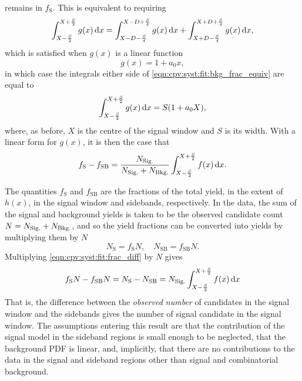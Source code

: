 remains in $f_{\text{S}}$.
This is equivalent to requiring
\begin{equation}
    \int_{X - \frac{S}{2}}^{X + \frac{S}{2}} g(x) \mathop{}\!\textnormal{d}{x}
    =
    \int_{X - D - \frac{S}{4}}^{X - D + \frac{S}{4}} g(x) \mathop{}\!\textnormal{d}{x} +
    \int_{X + D - \frac{S}{4}}^{X + D + \frac{S}{4}} g(x) \mathop{}\!\textnormal{d}{x},
  \label{eqn:cpv:syst:fit:bkg_frac_equiv}
\end{equation}
which is satisfied when $g(x)$ is a linear function
\begin{equation*}
  g(x) = 1 + a_{0}x,
\end{equation*}
in which case the integrals either side of 
\cref{eqn:cpv:syst:fit:bkg_frac_equiv} are equal to
\begin{equation}
    \int_{X - \frac{S}{2}}^{X + \frac{S}{2}} g(x) \mathop{}\!\textnormal{d}{x} =
      S(1 + a_{0}X),
\end{equation}
where, as before, $X$ is the centre of the signal window and $S$ is its width.
With a linear form for $g(x)$, it is then the case that
\begin{equation}
  f_{\text{S}} - f_{\text{SB}} = \frac{N_{\text{Sig.}}}{N_{\text{Sig.}} + N_{\text{Bkg.}}}
    \int_{X - \frac{S}{2}}^{X + \frac{S}{2}} f(x) \mathop{}\!\textnormal{d}{x}.
  \label{eqn:cpv:syst:fit:frac_diff}
\end{equation}

The quantities $f_{\text{S}}$ and $f_{\text{SB}}$ are the fractions of the 
total yield, in the extent of $h(x)$, in the signal window and sidebands, 
respectively.
In the data, the sum of the signal and background yields is taken to be the 
observed candidate count $N = N_{\text{Sig.}} + N_{\text{Bkg.}}$, and so the yield fractions can be 
converted into yields by multiplying them by $N$
\begin{equation}
  N_{\text{S}} = f_{\text{S}}N,\quad
  N_{\text{SB}} = f_{\text{SB}}N.
\end{equation}
Multiplying \cref{eqn:cpv:syst:fit:frac_diff} by $N$ gives
\begin{equation}
  f_{\text{S}}N - f_{\text{SB}}N =
    N_{\text{S}} - N_{\text{SB}} =
    N_{\text{Sig.}}
    \int_{X - \frac{S}{2}}^{X + \frac{S}{2}} f(x) \mathop{}\!\textnormal{d}{x}
  \label{eqn:cpv:syst:fit:frac_diff}
\end{equation}
That is, the difference between the \emph{observed number} of candidates in the 
signal window and the sidebands gives the number of signal candidate in the 
signal window.
The assumptions entering this result are that the contribution of the signal 
model in the sideband regions is small enough to be neglected, that the 
background \ac{PDF} is linear, and, implicitly, that there are no contributions 
to the data in the signal and sideband regions other than signal and 
combinatorial background.


